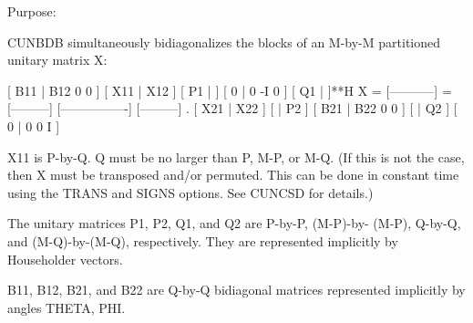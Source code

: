  \begin{DoxyParagraph}{Purpose\+: }
\begin{DoxyVerb} CUNBDB simultaneously bidiagonalizes the blocks of an M-by-M
 partitioned unitary matrix X:

                                 [ B11 | B12 0  0 ]
     [ X11 | X12 ]   [ P1 |    ] [  0  |  0 -I  0 ] [ Q1 |    ]**H
 X = [-----------] = [---------] [----------------] [---------]   .
     [ X21 | X22 ]   [    | P2 ] [ B21 | B22 0  0 ] [    | Q2 ]
                                 [  0  |  0  0  I ]

 X11 is P-by-Q. Q must be no larger than P, M-P, or M-Q. (If this is
 not the case, then X must be transposed and/or permuted. This can be
 done in constant time using the TRANS and SIGNS options. See CUNCSD
 for details.)

 The unitary matrices P1, P2, Q1, and Q2 are P-by-P, (M-P)-by-
 (M-P), Q-by-Q, and (M-Q)-by-(M-Q), respectively. They are
 represented implicitly by Householder vectors.

 B11, B12, B21, and B22 are Q-by-Q bidiagonal matrices represented
 implicitly by angles THETA, PHI.\end{DoxyVerb}
 
\end{DoxyParagraph}


